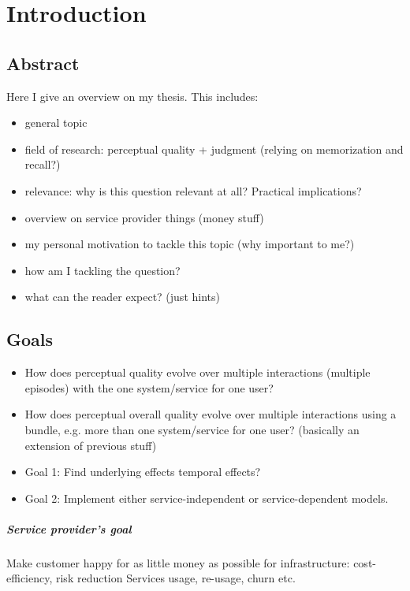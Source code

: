 \chapter{Introduction}
\section*{Abstract}
Here I give an overview on my thesis.
This includes:
\begin{itemize}
\item general topic
\item field of research: perceptual quality + judgment (relying on memorization and recall?)
\item relevance: why is this question relevant at all? Practical implications?
\item overview on service provider things (money stuff)
\item my personal motivation to tackle this topic (why important to me?)
\item how am I tackling the question?
\item what can the reader expect? (just hints)
\end{itemize}

\section{Goals}
\begin{itemize}
\item How does perceptual quality evolve over multiple interactions (multiple episodes) with the one system/service for one user?
\item How does perceptual overall quality evolve over multiple interactions using a bundle, e.g. more than one system/service for one user? (basically an extension of previous stuff)
\item Goal 1: Find underlying effects temporal effects? 
\item Goal 2: Implement either service-independent or service-dependent models.
\end{itemize}


\paragraph*{Service provider's goal}
Make customer happy for as little money as possible for infrastructure: cost-efficiency, risk reduction
Services usage, re-usage, churn etc.

